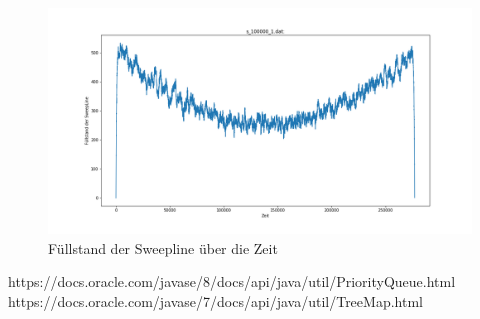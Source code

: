 \documentclass[conference]{IEEEtran}
\begin{document}
\begin{figure}[!tbp]
\begin{minipage}[b]{0.5\textwidth}
		\end{minipage}
			\hfill
		\begin{minipage}[b]{0.5\textwidth}
			\includegraphics[width=\textwidth]{s100000+1.png}
		\end{minipage}
		\caption{Füllstand der Sweepline über die Zeit}
		\label{fullstand}
	\end{figure}
	
	\begin{thebibliography}{00}
		https://docs.oracle.com/javase/8/docs/api/java/util/PriorityQueue.html
		https://docs.oracle.com/javase/7/docs/api/java/util/TreeMap.html
	\end{thebibliography}
\end{document}
